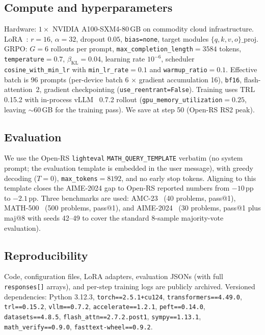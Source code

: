 \documentclass[journal,onecolumn,11pt]{IEEEtran}
\begin{document}
\subsection{Compute and hyperparameters}
Hardware: $1\times$ NVIDIA A100-SXM4-80\,GB on commodity cloud
infrastructure. LoRA~\cite{hu2022lora}: $r{=}16$, $\alpha{=}32$, dropout
$0.05$, \texttt{bias=none}, target modules
$\{q,k,v,o\}\_\mathrm{proj}$. GRPO: $G{=}6$ rollouts per prompt,
\texttt{max\_completion\_length}$=3584$ tokens, \texttt{temperature}$=0.7$,
$\beta_{\text{KL}}=0.04$, learning rate $10^{-6}$, scheduler
\texttt{cosine\_with\_min\_lr} with \texttt{min\_lr\_rate}$=0.1$ and
\texttt{warmup\_ratio}$=0.1$. Effective batch is 96 prompts (per-device
batch 6 $\times$ gradient accumulation 16), \texttt{bf16},
flash-attention~2, gradient checkpointing
(\texttt{use\_reentrant=False}). Training uses TRL~\cite{trl_2025}
0.15.2 with in-process vLLM~\cite{kwon2023vllm} 0.7.2 rollout
(\texttt{gpu\_memory\_utilization}$=0.25$, leaving $\sim 60$\,GB for the
training pass). We save at step 50 (Open-RS RS2 peak).

\subsection{Evaluation}
We use the Open-RS \texttt{lighteval} \texttt{MATH\_QUERY\_TEMPLATE}
verbatim (no system prompt; the evaluation template is embedded in the
user message), with greedy decoding ($T{=}0$), \texttt{max\_tokens}$=8192$,
and no early stop tokens. Aligning to this template closes the AIME-2024
gap to Open-RS reported numbers from $-10$\,pp to $-2.1$\,pp. Three
benchmarks are used: AMC-23~\cite{amc23_dataset} (40 problems, pass@1),
MATH-500~\cite{lightman2024verify} (500 problems, pass@1), and
AIME-2024~\cite{aime2024_dataset} (30 problems, pass@1 plus maj@8 with
seeds 42--49 to cover the standard 8-sample majority-vote evaluation).

\subsection{Reproducibility}
Code, configuration files, LoRA adapters, evaluation JSONs (with full
\texttt{responses[]} arrays), and per-step training logs are publicly
archived. Versioned dependencies: Python 3.12.3,
\texttt{torch==2.5.1+cu124}, \texttt{transformers==4.49.0},
\texttt{trl==0.15.2}, \texttt{vllm==0.7.2}, \texttt{accelerate==1.2.1},
\texttt{peft==0.14.0}, \texttt{datasets==4.8.5},
\texttt{flash\_attn==2.7.2.post1}, \texttt{sympy==1.13.1},
\texttt{math\_verify==0.9.0}, \texttt{fasttext-wheel==0.9.2}.
\end{document}
